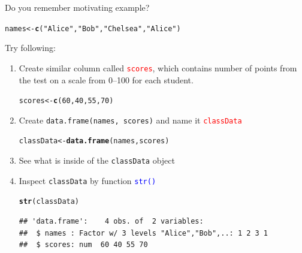 \documentclass[12pt]{beamer}\usepackage[]{graphicx}\usepackage[]{color}
\makeatletter
\newcommand{\hlnum}[1]{\textcolor[rgb]{0.686,0.059,0.569}{#1}}%
\newcommand{\hlstr}[1]{\textcolor[rgb]{0.192,0.494,0.8}{#1}}%
\newcommand{\hlstd}[1]{\textcolor[rgb]{0.345,0.345,0.345}{#1}}%
\newcommand{\hlkwb}[1]{\textcolor[rgb]{0.69,0.353,0.396}{#1}}%
\newcommand{\hlkwd}[1]{\textcolor[rgb]{0.737,0.353,0.396}{\textbf{#1}}}%
\newenvironment{kframe}{%
 \def\at@end@of@kframe{}%
 \ifinner\ifhmode%
  \def\at@end@of@kframe{\end{minipage}}%
  \begin{minipage}{\columnwidth}%
 \fi\fi%
 \def\FrameCommand##1{\hskip\@totalleftmargin \hskip-\fboxsep
 \colorbox{shadecolor}{##1}\hskip-\fboxsep
     \hskip-\linewidth \hskip-\@totalleftmargin \hskip\columnwidth}%
 \MakeFramed {\advance\hsize-\width
   \@totalleftmargin\z@ \linewidth\hsize
   \@setminipage}}%
 {\par\unskip\endMakeFramed%
 \at@end@of@kframe}
\newenvironment{knitrout}{}{} %
\makeatother
\begin{document}

\begin{frame}[fragile]
Do you remember motivating example?

\begin{knitrout}
\color{fgcolor}\begin{kframe}
\begin{alltt}
\hlstd{names} \hlkwb{<-} \hlkwd{c}\hlstd{(}\hlstr{"Alice"}\hlstd{,} \hlstr{"Bob"}\hlstd{,} \hlstr{"Chelsea"}\hlstd{,} \hlstr{"Alice"}\hlstd{)}
\end{alltt}
\end{kframe}
\end{knitrout}

Try following:
\begin{enumerate}
 \item Create similar column called \textcolor{red}{\texttt{scores}}, which contains number of points from the test on a scale from 0--100 for each student.
\begin{knitrout}
\color{fgcolor}\begin{kframe}
\begin{alltt}
\hlstd{scores} \hlkwb{<-} \hlkwd{c}\hlstd{(}\hlnum{60}\hlstd{,} \hlnum{40}\hlstd{,} \hlnum{55}\hlstd{,} \hlnum{70}\hlstd{)}
\end{alltt}
\end{kframe}
\end{knitrout}
 \item Create \texttt{data.frame(names, scores)} and name it \textcolor{red}{\texttt{classData}}
\begin{knitrout}
\color{fgcolor}\begin{kframe}
\begin{alltt}
\hlstd{classData} \hlkwb{<-} \hlkwd{data.frame}\hlstd{(names, scores)}
\end{alltt}
\end{kframe}
\end{knitrout}
 \item See what is inside of the \texttt{classData} object
 \item Inspect \texttt{classData} by function \textcolor{blue}{\texttt{str()}} 
\begin{knitrout}
\color{fgcolor}\begin{kframe}
\begin{alltt}
\hlkwd{str}\hlstd{(classData)}
\end{alltt}
\begin{verbatim}
## 'data.frame':	4 obs. of  2 variables:
##  $ names : Factor w/ 3 levels "Alice","Bob",..: 1 2 3 1
##  $ scores: num  60 40 55 70
\end{verbatim}
\end{kframe}
\end{knitrout}
\end{enumerate}

\end{frame}
\end{document}
